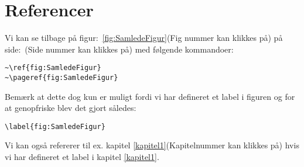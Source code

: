 \documentclass[class=report, crop=false]{standalone}
\begin{document}
    \section{Referencer}
    Vi kan se tilbage på figur:~\ref{fig:SamledeFigur}(Fig nummer kan klikkes på) på side:~\pageref{fig:SamledeFigur}(Side nummer kan klikkes på) med følgende kommandoer:
    \begin{tcolorbox}
        \verb|~\ref{fig:SamledeFigur}|\\
        \verb|~\pageref{fig:SamledeFigur}|
    \end{tcolorbox}
    \noindent Bemærk at dette dog kun er muligt fordi vi har defineret et label i figuren og for at genopfriske blev det gjort således:
    \begin{tcolorbox}
        \verb|\label{fig:SamledeFigur}|
    \end{tcolorbox}
    \noindent Vi kan også refererer til ex. kapitel \ref{kapitel1}(Kapitelnummer kan klikkes på) hvis vi har defineret et label i kapitel \ref{kapitel1}.
\end{document}
